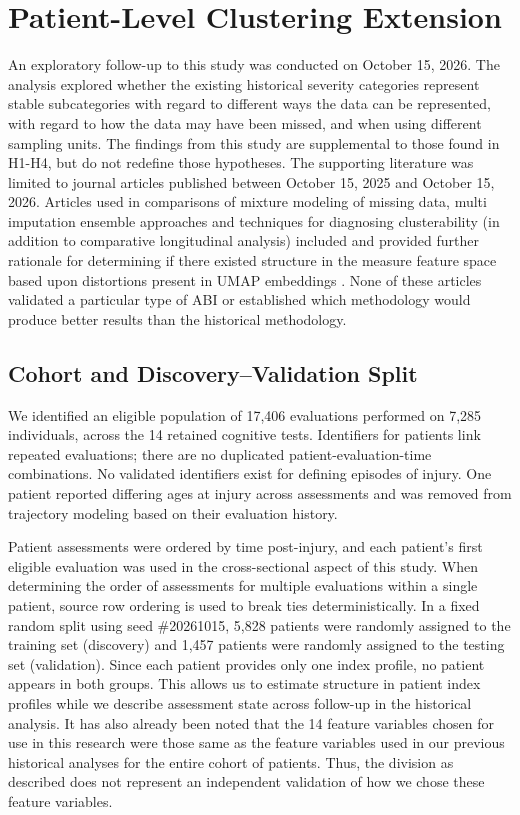 \section{Patient-Level Clustering Extension}\label{sec:extension_methods}

An exploratory follow-up to this study was conducted on October 15, 2026. The analysis explored whether the existing historical severity categories represent stable subcategories with regard to different ways the data can be represented, with regard to how the data may have been missed, and when using different sampling units. The findings from this study are supplemental to those found in H1-H4, but do not redefine those hypotheses. The supporting literature was limited to journal articles published between October 15, 2025 and October 15, 2026. Articles used in comparisons of mixture modeling of missing data, multi imputation ensemble approaches and techniques for diagnosing clusterability (in addition to comparative longitudinal analysis) included \textcite{tong2025mixturemissing,tomo2026ensemble,neville2026clusterability,julia2026longitudinal} and provided further rationale for determining if there existed structure in the measure feature space based upon distortions present in UMAP embeddings \parencite{chen2026umapartifacts}. None of these articles validated a particular type of ABI or established which methodology would produce better results than the historical methodology.

\subsection{Cohort and Discovery--Validation Split}

We identified an eligible population of 17,406 evaluations performed on 7,285 individuals, across the 14 retained cognitive tests. Identifiers for patients link repeated evaluations; there are no duplicated patient-evaluation-time combinations. No validated identifiers exist for defining episodes of injury. One patient reported differing ages at injury across assessments and was removed from trajectory modeling based on their evaluation history.

Patient assessments were ordered by time post-injury, and each patient's first eligible evaluation was used in the cross-sectional aspect of this study. When determining the order of assessments for multiple evaluations within a single patient, source row ordering is used to break ties deterministically. In a fixed random split using seed \#20261015, 5,828 patients were randomly assigned to the training set (discovery) and 1,457 patients were randomly assigned to the testing set (validation). Since each patient provides only one index profile, no patient appears in both groups. This allows us to estimate structure in patient index profiles while we describe assessment state across follow-up in the historical analysis. It has also already been noted that the 14 feature variables chosen for use in this research were those same as the feature variables used in our previous historical analyses for the entire cohort of patients. Thus, the division as described does not represent an independent validation of how we chose these feature variables.


